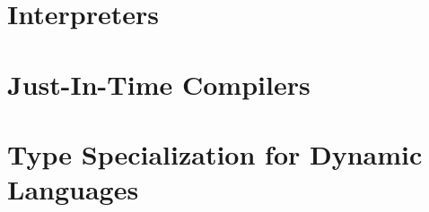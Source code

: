 \section{Interpreters}

\section{Just-In-Time Compilers}

\section{Type Specialization for Dynamic Languages}
